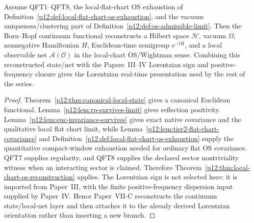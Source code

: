 \documentclass[12pt,a4paper]{article}
\begin{document}
\begin{theorem}
\label{p12:thm:bh-os-reconstruction}
Assume QFT1--QFT8, the local-flat-chart OS exhaustion of Definition~\ref{p12:def:local-flat-chart-os-exhaustion}, and the vacuum uniqueness/clustering part of Definition~\ref{p12:def:os-admissible-limit}.  Then the Born--Hopf continuum functional reconstructs a Hilbert space \(\mathcal H\), vacuum \(\Omega\), nonnegative Hamiltonian \(H\), Euclidean-time semigroup \(e^{-tH}\), and a local observable net \(\mathcal A(\mathcal O)\) in the local-chart OS/Wightman sense.  Combining this reconstructed state/net with the Papers~III--IV Lorentzian sign and positive-frequency closure gives the Lorentzian real-time presentation used by the rest of the series.
\end{theorem}
\begin{proof}
Theorem~\ref{p12:thm:canonical-local-state} gives a canonical Euclidean functional.  Lemma~\ref{p12:lem:rp-survives-limit} gives reflection positivity.  Lemma~\ref{p12:lem:euc-invariance-survives} gives exact native covariance and the qualitative local flat chart limit, while Lemma~\ref{p12:lem:tier2-flat-chart-covariance} and Definition~\ref{p12:def:local-flat-chart-os-exhaustion} supply the quantitative compact-window exhaustion needed for ordinary flat OS covariance.  QFT7 supplies regularity, and QFT8 supplies the declared sector nontriviality witness when an interacting sector is claimed.  Therefore Theorem~\ref{p12:thm:local-chart-os-reconstruction} applies.  The Lorentzian sign is not selected here: it is imported from Paper~III, with the finite positive-frequency dispersion input supplied by Paper~IV.  Hence Paper~VII-C reconstructs the continuum state/local-net layer and then attaches it to the already derived Lorentzian orientation rather than inserting a new branch.
\end{proof}
\end{document}

